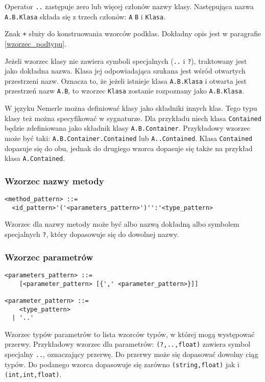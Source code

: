 \documentclass[a4paper,12pt]{mwbk}
\begin{document}
Operator \lstinline!..! zastępuje zero lub więcej członów nazwy klasy.
Następująca nazwa \lstinline!A.B.Klasa! składa się z trzech członów:
\lstinline!A! \lstinline!B! i \lstinline!Klasa!.

Znak \lstinline!+! służy do konstruowania wzorców podklas. Dokładny opis 
jest w paragrafie \ref{wzorzec_podtypu}.

Jeżeli wzorzec klasy nie zawiera symboli specjalnych
(\lstinline!..! i \lstinline!?!), traktowany jest jako dokładna nazwa. Klasa
jej odpowiadająca szukana jest wśród otwartych przestrzeni nazw. Oznacza to, że
jeżeli istnieje klasa \lstinline!A.B.Klasa! i otwarta jest przestrzeń nazw
\lstinline!A.B!, to wzorzec \lstinline!Klasa! zostanie rozpoznany jako
\lstinline!A.B.Klasa!.

W języku Nemerle można definiować klasy jako składniki innych klas. Tego typu
klasy też można specyfikować w sygnaturze. Dla przykładu niech klasa
\lstinline!Contained! będzie zdefiniowana jako składnik klasy
\lstinline!A.B.Container!. Przykładowy wzorzec może być taki:
\lstinline!A.B.Container.Contained! lub \lstinline!A..Contained!.  Klasa
\lstinline!Contained! dopasuje się do obu, jednak do drugiego wzorca dopasuje
się także na przykład klasa \lstinline!A.Contained!.

\subsubsection{Wzorzec nazwy metody}

\begin{lstlisting}[style=grammar]
<method_pattern> ::=
  <id_pattern>'('<parameters_pattern>')'':'<type_pattern>
\end{lstlisting}

Wzorzec dla nazwy metody może być albo nazwą dokładną albo symbolem
specjalnych \lstinline!?!, który dopasowuje się do dowolnej nazwy.

\subsubsection{Wzorzec parametrów}

\begin{lstlisting}[style=grammar]
<parameters_pattern> ::=
    [<parameter_pattern> [{',' <parameter_pattern>}]]

<parameter_pattern> ::=
    <type_pattern>
  | '..'
\end{lstlisting}

Wzorzec typów parametrów to lista wzorców typów, w której mogą występować
przerwy. Przykładowy wzorzec dla parametrów: \lstinline!(?,..,float)! zawiera
symbol specjalny \lstinline!..!, oznaczający przerwę.  Do przerwy może się dopasować 
dowolny ciąg typów. Do podanego wzorca dopasowuje się zarówno
\lstinline!(string,float)! jak i \lstinline!(int,int,float)!.
\end{document}
